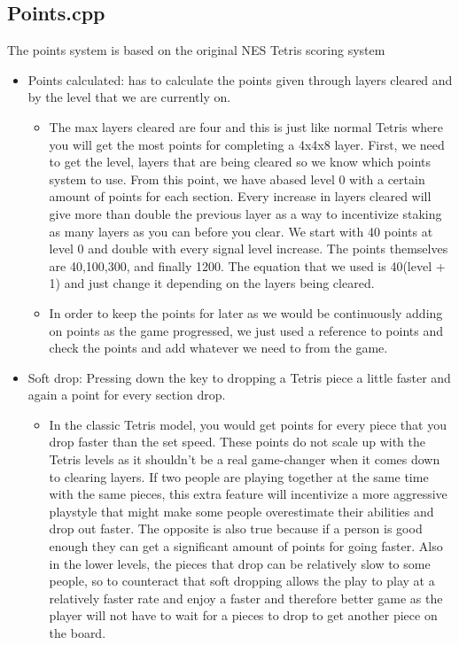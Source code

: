 \documentclass[letterpaper, 12pt]{article}
\begin{document}
\subsection{Points.cpp}
The points system is based on the original NES Tetris scoring system
\begin{itemize}
    \item Points calculated: has to calculate the points given through layers cleared and by the level that we are currently on.
        \begin{itemize}
            \item The max layers cleared are four and this is just like normal Tetris where you will get the most points for completing a 4x4x8 layer. First, we need to get the level, layers that are being cleared so we know which points system to use. From this point, we have abased level 0 with a certain amount of points for each section. Every increase in layers cleared will give more than double the previous layer as a way to incentivize staking as many layers as you can before you clear. We start with 40 points at level 0 and double with every signal level increase. The points themselves are 40,100,300, and finally 1200. The equation that we used is 40(level + 1) and just change it depending on the layers being cleared.
            \item In order to keep the points for later as we would be continuously adding on points as the game progressed, we just used a reference to points and check the points and add whatever we need to from the game.
        \end{itemize}
    \item Soft drop: Pressing down the key to dropping a Tetris piece a little faster and again a point for every section drop.
        \begin{itemize}
            \item In the classic Tetris model, you would get points for every piece that you drop faster than the set speed. These points do not scale up with the Tetris levels as it shouldn’t be a real game-changer when it comes down to clearing layers. If two people are playing together at the same time with the same pieces, this extra feature will incentivize a more aggressive playstyle that might make some people overestimate their abilities and drop out faster. The opposite is also true because if a person is good enough they can get a significant amount of points for going faster. Also in the lower levels, the pieces that drop can be relatively slow to some people, so to counteract that soft dropping allows the play to play at a relatively faster rate and enjoy a faster and therefore better game as the player will not have to wait for a pieces to drop to get another piece on the board.
        \end{itemize}
\end{itemize}
\end{document}
